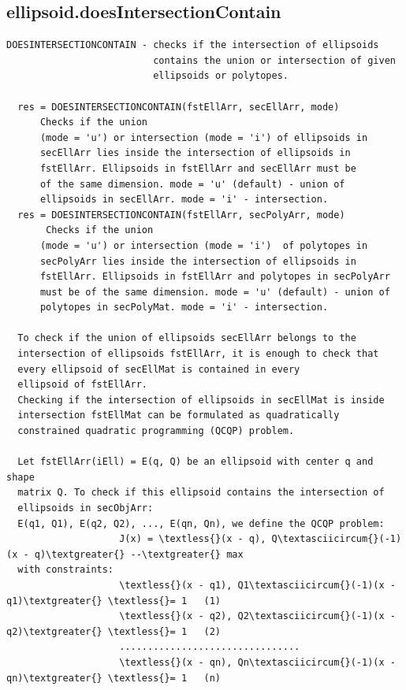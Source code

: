 \documentclass[letterpaper,10pt,english]{sphinxmanual}
\begin{document}
\subsection{ellipsoid.doesIntersectionContain}
\label{chap_functions:ellipsoid-doesintersectioncontain}
\begin{Verbatim}[commandchars=\\\{\}]
DOESINTERSECTIONCONTAIN - checks if the intersection of ellipsoids
                          contains the union or intersection of given
                          ellipsoids or polytopes.

  res = DOESINTERSECTIONCONTAIN(fstEllArr, secEllArr, mode)
      Checks if the union
      (mode = 'u') or intersection (mode = 'i') of ellipsoids in
      secEllArr lies inside the intersection of ellipsoids in
      fstEllArr. Ellipsoids in fstEllArr and secEllArr must be
      of the same dimension. mode = 'u' (default) - union of
      ellipsoids in secEllArr. mode = 'i' - intersection.
  res = DOESINTERSECTIONCONTAIN(fstEllArr, secPolyArr, mode)
       Checks if the union
      (mode = 'u') or intersection (mode = 'i')  of polytopes in
      secPolyArr lies inside the intersection of ellipsoids in
      fstEllArr. Ellipsoids in fstEllArr and polytopes in secPolyArr
      must be of the same dimension. mode = 'u' (default) - union of
      polytopes in secPolyMat. mode = 'i' - intersection.

  To check if the union of ellipsoids secEllArr belongs to the
  intersection of ellipsoids fstEllArr, it is enough to check that
  every ellipsoid of secEllMat is contained in every
  ellipsoid of fstEllArr.
  Checking if the intersection of ellipsoids in secEllMat is inside
  intersection fstEllMat can be formulated as quadratically
  constrained quadratic programming (QCQP) problem.

  Let fstEllArr(iEll) = E(q, Q) be an ellipsoid with center q and shape
  matrix Q. To check if this ellipsoid contains the intersection of
  ellipsoids in secObjArr:
  E(q1, Q1), E(q2, Q2), ..., E(qn, Qn), we define the QCQP problem:
                    J(x) = \textless{}(x - q), Q\textasciicircum{}(-1)(x - q)\textgreater{} --\textgreater{} max
  with constraints:
                    \textless{}(x - q1), Q1\textasciicircum{}(-1)(x - q1)\textgreater{} \textless{}= 1   (1)
                    \textless{}(x - q2), Q2\textasciicircum{}(-1)(x - q2)\textgreater{} \textless{}= 1   (2)
                    ................................
                    \textless{}(x - qn), Qn\textasciicircum{}(-1)(x - qn)\textgreater{} \textless{}= 1   (n)


\end{Verbatim}
\end{document}
